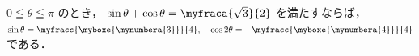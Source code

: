 \documentclass[../../../../uem_mei_q.tex]{subfiles}
\begin{document}
    $0\leqq\theta\leqq\pi$ のとき，%
    $\sin\theta+\cos\theta=\myfraca{\sqrt{3}}{2}$ を満たすならば，\\
    \hspace{3\zw}%
    $\displaystyle%
        \sin\theta=\myfracc{\myboxe{\mynumbera{3}}}{4},\quad%
        \cos2\theta=-\myfracc{\myboxe{\mynumbera{4}}}{4}%
    $\\
    である．
\end{document}
